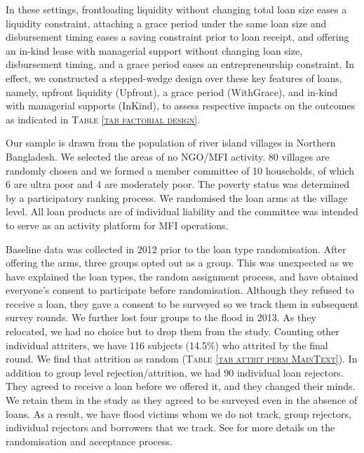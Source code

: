 	In these settings, frontloading liquidity without changing total loan size eases a liquidity constraint, attaching a grace period under the same loan size and disbursement timing eases a saving constraint prior to loan receipt, and offering an in-kind lease with managerial support without changing loan size, disbursement timing, and a grace period eases an entrepreneurship constraint. In effect, we constructed a stepped-wedge design over these key features of loans, namely, upfront liquidity (\textsf{Upfront}), a grace period (\textsf{WithGrace}), and in-kind with managerial supports (\textsf{InKind}), to assess respective impacts on the outcomes as indicated in \textsc{\normalsize Table \ref{tab factorial design}}.

	Our sample is drawn from the population of river island villages in Northern Bangladesh. We selected the areas of no NGO/MFI activity. 80 villages are randomly chosen and we formed a member committee of 10 households, of which 6 are ultra poor and 4 are moderately poor. The poverty status was determined by a participatory ranking process. We randomised the loan arms at the village level. All loan products are of individual liability and the committee was intended to serve as an activity platform for MFI operations.

	Baseline data was collected in 2012 prior to the loan type randomisation. After offering the arms, three groups opted out as a group. This was unexpected as we have explained the loan types, the random assignment process, and have obtained everyone’s consent to participate before randomisation. Although they refused to receive a loan, they gave a consent to be surveyed so we track them in subsequent survey rounds. We further lost four groups to the flood in 2013. As they relocated, we had no choice but to drop them from the study. Counting other individual attriters, we have 116 subjects (14.5\%) who attrited by the final round. We find that attrition as random (\textsc{\small Table \ref{tab attrit perm MainText}}). In addition to group level rejection/attrition, we had 90 individual loan rejectors. They agreed to receive a loan before we offered it, and they changed their minds. We retain them in the study as they agreed to be surveyed even in the absence of loans. As a result, we have flood victims whom we do not track, group rejectors, individual rejectors and borrowers that we track. See \citet{GUK2016} for more details on the randomisation and acceptance process.




